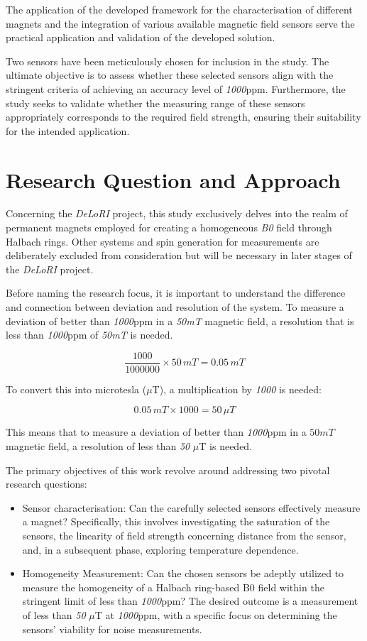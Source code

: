The application of the developed framework for the characterisation of
different magnets and the integration of various available magnetic
field sensors serve the practical application and validation of the
developed solution.

Two sensors have been meticulously chosen for inclusion in the study.
The ultimate objective is to assess whether these selected sensors align
with the stringent criteria of achieving an accuracy level of
\emph{1000}\gls{ppm}. Furthermore, the study seeks to validate whether
the measuring range of these sensors appropriately corresponds to the
required field strength, ensuring their suitability for the intended
application.

\hypertarget{research-question-and-approach}{%
\section{Research Question and
Approach}\label{research-question-and-approach}}

Concerning the \emph{DeLoRI} project, this study exclusively delves into
the realm of permanent magnets employed for creating a homogeneous
\emph{B0} field through Halbach rings. Other systems and spin generation
for measurements are deliberately excluded from consideration but will
be necessary in later stages of the \emph{DeLoRI} project.

Before naming the research focus, it is important to understand the
difference and connection between deviation and resolution of the
system. To measure a deviation of better than \emph{1000}\gls{ppm} in a
\emph{50mT} magnetic field, a resolution that is less than
\emph{1000}\gls{ppm} of \emph{50mT} is needed.

\[\frac{1000}{1000000} \times 50 \, mT = 0.05 \, mT \]

To convert this into microtesla (\(\mu\)T), a multiplication by
\emph{1000} is needed:

\[ 0.05 \, mT \times 1000 = 50 \, \mu T \]

This means that to measure a deviation of better than
\emph{1000}\gls{ppm} in a \(50mT\) magnetic field, a resolution of less
than \emph{50} \(\mu\)T is needed.

The primary objectives of this work revolve around addressing two
pivotal research questions:

\begin{itemize}
\item
  Sensor characterisation: Can the carefully selected sensors
  effectively measure a magnet? Specifically, this involves
  investigating the saturation of the sensors, the linearity of field
  strength concerning distance from the sensor, and, in a subsequent
  phase, exploring temperature dependence.
\item
  Homogeneity Measurement: Can the chosen sensors be adeptly utilized to
  measure the homogeneity of a Halbach ring-based B0 field within the
  stringent limit of less than \emph{1000}\gls{ppm}? The desired outcome
  is a measurement of less than \emph{50} \(\mu\)T at
  \emph{1000}\gls{ppm}, with a specific focus on determining the
  sensors' viability for noise measurements.
\end{itemize}

